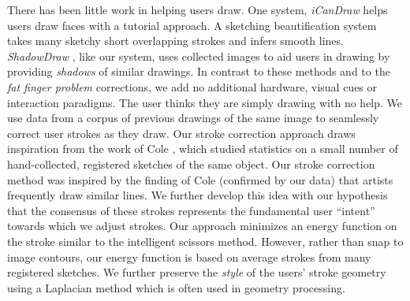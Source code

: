 There has been little work in helping users draw. One system, \emph{iCanDraw}\cite{Dixon:2010:IUS} helps users draw faces with a tutorial approach. A sketching beautification system~\cite{Orbay2011} takes many sketchy short overlapping strokes and infers smooth lines. \emph{ShadowDraw} \cite{Lee:2011}, like our system, uses collected images to aid users in drawing by providing {\em shadows} of similar drawings.  In contrast to these methods and to the \emph{fat finger problem} corrections, we add no additional hardware, visual cues or interaction paradigms. The user thinks they are simply drawing with no help. We use data from a corpus of previous drawings of the same image to seamlessly correct user strokes as they draw. Our stroke correction approach draws inspiration from the work of Cole \etal {}, which studied statistics on a small number of hand-collected, registered sketches of the same object. Our stroke correction method was inspired by the finding of Cole \etal (confirmed by our data) that artists frequently draw similar lines.  We further develop this idea with our hypothesis that the consensus of these strokes represents the fundamental user ``intent'' towards which we adjust strokes. Our approach minimizes an energy function on the stroke similar to the intelligent scissors method\cite{Mortensen:1995:ISF}. However, rather than snap to image contours, our energy function is based on average strokes from many registered sketches. We further preserve the {\em style} of the users' stroke geometry using a Laplacian method which is often used in geometry processing\cite{Sorkine:2004:LSE}.
